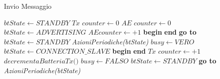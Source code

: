 \begin{algorithm}[ph]
	\caption{Invio Messaggio}\label{alg:invia_msg}
	\begin{algorithmic}[1]
				\State $ \textit{btState} \gets STANDBY$
			\EndIf
		\State $ \textit{Tx counter} \gets 0 $ 
		\Label {}
		\State $ \textit{AE counter} \gets 0 $ 
		\State $ \textit{btState} \gets ADVERTISING$
		\State $ AE counter \gets +1 $
		\State \textbf{begin}
			\State\hspace{\algorithmicindent}{ADVERTISING EVENT}
		\State \textbf{end}
				\State \textbf{go to} 
			\Else
				\State $btState \gets STANDBY$
				\State \textit{AzioniPeriodiche(btState)}
			\EndIf
		\EndIf
		\State $ \textit{busy}\gets VERO $
		\State $\textit{btState}\gets CONNECTION\_SLAVE$
		\State \textbf{begin}
			\State\hspace{\algorithmicindent}{CONNECTION EVENT}
		\State \textbf{end}
		\State $\textit{Tx counter}\gets +1$
		\State $ \textit{decrementaBatteriaTx()}$
		\State $\textit{busy}\gets FALSO$
		\State $ \textit{btState}\gets STANDBY $
			\State \textbf{go to} 
		\Else
			\State \textit{AzioniPeriodiche(btState)}
		\EndIf
		\EndFunction
	\end{algorithmic}
\end{algorithm}

